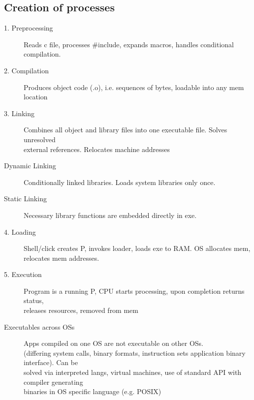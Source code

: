 \subsection*{Creation of processes}
\begin{description}
  \item[1. Preprocessing] Reads c file, processes \#include, expands macros, handles conditional compilation.
  \item[2. Compilation] Produces object code (.o), i.e. sequences of bytes, loadable into any mem location
  \item[3. Linking] Combines all object and library files into one executable file. Solves unresolved \\ external references. Relocates machine addresses
  \item[Dynamic Linking] Conditionally linked libraries. Loads system libraries only once.
  \item[Static Linking] Necessary library functions are embedded directly in exe.
  \item[4. Loading] Shell/click creates P, invokes loader, loads exe to RAM. OS allocates mem, \\ relocates mem addresses.
  \item[5. Execution] Program is a running P, CPU starts processing, upon completion returns status,\\ releases resources, removed from mem

  \item[Executables across OSs] Apps compiled on one OS are not executable on other OSs. \\ (differing system calls, binary formats, instruction sets application binary interface). Can be \\ solved via interpreted langs, virtual machines, use of standard API with compiler generating \\ binaries in OS specific language (e.g. POSIX)
\end{description}

